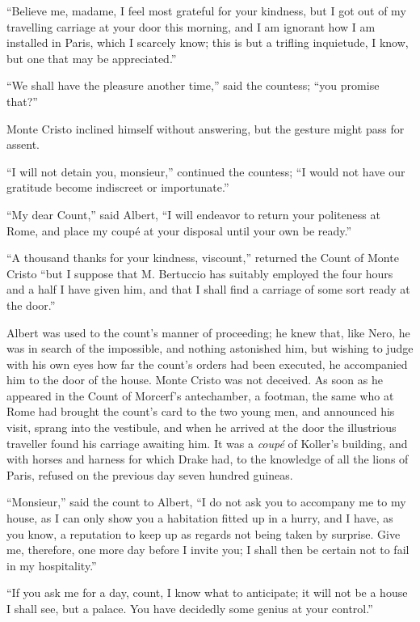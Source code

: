 “Believe me, madame, I feel most grateful for your kindness, but I got
out of my travelling carriage at your door this morning, and I am
ignorant how I am installed in Paris, which I scarcely know; this is
but a trifling inquietude, I know, but one that may be appreciated.”

“We shall have the pleasure another time,” said the countess; “you
promise that?”

Monte Cristo inclined himself without answering, but the gesture might
pass for assent.

“I will not detain you, monsieur,” continued the countess; “I would not
have our gratitude become indiscreet or importunate.”

“My dear Count,” said Albert, “I will endeavor to return your
politeness at Rome, and place my coupé at your disposal until your own
be ready.”

“A thousand thanks for your kindness, viscount,” returned the Count of
Monte Cristo “but I suppose that M. Bertuccio has suitably employed the
four hours and a half I have given him, and that I shall find a
carriage of some sort ready at the door.”

Albert was used to the count’s manner of proceeding; he knew that, like
Nero, he was in search of the impossible, and nothing astonished him,
but wishing to judge with his own eyes how far the count’s orders had
been executed, he accompanied him to the door of the house. Monte
Cristo was not deceived. As soon as he appeared in the Count of
Morcerf’s antechamber, a footman, the same who at Rome had brought the
count’s card to the two young men, and announced his visit, sprang into
the vestibule, and when he arrived at the door the illustrious
traveller found his carriage awaiting him. It was a \textit{coupé} of Koller’s
building, and with horses and harness for which Drake had, to the
knowledge of all the lions of Paris, refused on the previous day seven
hundred guineas.

“Monsieur,” said the count to Albert, “I do not ask you to accompany me
to my house, as I can only show you a habitation fitted up in a hurry,
and I have, as you know, a reputation to keep up as regards not being
taken by surprise. Give me, therefore, one more day before I invite
you; I shall then be certain not to fail in my hospitality.”

“If you ask me for a day, count, I know what to anticipate; it will not
be a house I shall see, but a palace. You have decidedly some genius at
your control.”

